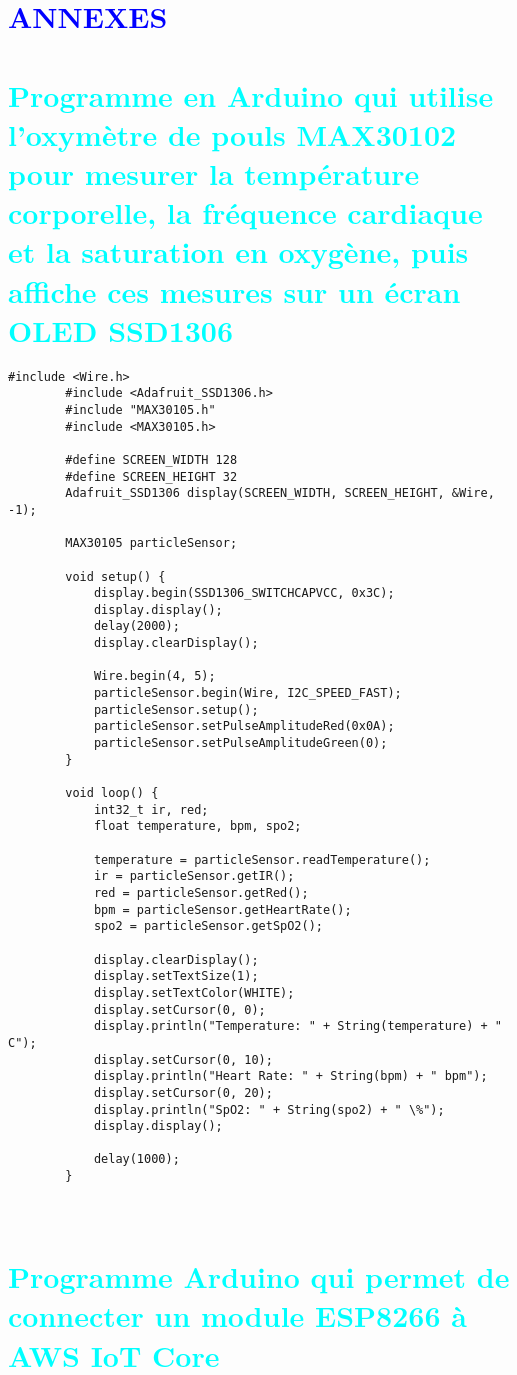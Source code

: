 

\section*{\textcolor{blue}{ANNEXES}}

\section*{\textcolor{cyan}{Programme en Arduino qui utilise l'oxymètre de pouls MAX30102 pour mesurer la température corporelle, la fréquence cardiaque et la saturation en oxygène, puis affiche ces mesures sur un écran OLED SSD1306 }}

\begin{flushleft}
	\begin{lstlisting}[style=CStyle]
		#include <Wire.h>
		#include <Adafruit_SSD1306.h>
		#include "MAX30105.h"
		#include <MAX30105.h>
		
		#define SCREEN_WIDTH 128
		#define SCREEN_HEIGHT 32
		Adafruit_SSD1306 display(SCREEN_WIDTH, SCREEN_HEIGHT, &Wire, -1);
		
		MAX30105 particleSensor;
		
		void setup() {
			display.begin(SSD1306_SWITCHCAPVCC, 0x3C);
			display.display();
			delay(2000);
			display.clearDisplay();
			
			Wire.begin(4, 5);
			particleSensor.begin(Wire, I2C_SPEED_FAST);
			particleSensor.setup();
			particleSensor.setPulseAmplitudeRed(0x0A);
			particleSensor.setPulseAmplitudeGreen(0);
		}
		
		void loop() {
			int32_t ir, red;
			float temperature, bpm, spo2;
			
			temperature = particleSensor.readTemperature();
			ir = particleSensor.getIR();
			red = particleSensor.getRed();
			bpm = particleSensor.getHeartRate();
			spo2 = particleSensor.getSpO2();
			
			display.clearDisplay();
			display.setTextSize(1);
			display.setTextColor(WHITE);
			display.setCursor(0, 0);
			display.println("Temperature: " + String(temperature) + " C");
			display.setCursor(0, 10);
			display.println("Heart Rate: " + String(bpm) + " bpm");
			display.setCursor(0, 20);
			display.println("SpO2: " + String(spo2) + " \%");
			display.display();
			
			delay(1000);
		}
		
		
	\end{lstlisting}
\section*{\textcolor{cyan}{Programme Arduino qui permet de connecter un module ESP8266 à AWS IoT Core}}
	

\end{flushleft}
